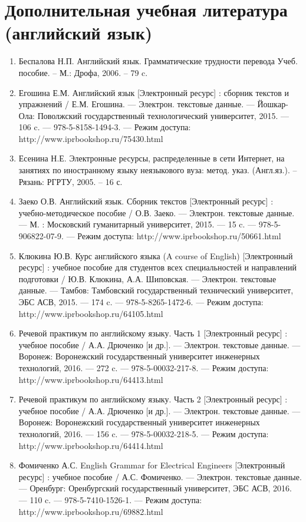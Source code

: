 \section{Дополнительная учебная литература (английский язык)}
\begin{enumerate}
\item Беспалова Н.П. Английский язык. Грамматические трудности перевода Учеб. пособие. – М.: Дрофа, 2006. – 79 c.
\item Егошина Е.М. Английский язык [Электронный ресурс] : сборник текстов и упражнений / Е.М. Егошина. — Электрон. текстовые данные. — Йошкар-Ола: Поволжский государственный технологический университет, 2015. — 106 c. — 978-5-8158-1494-3. — Режим доступа: http://www.iprbookshop.ru/75430.html
\item Есенина Н.Е. Электронные ресурсы, распределенные в сети Интернет, на занятиях по иностранному языку неязыкового вуза: метод. указ. (Англ.яз.). – Рязань: РГРТУ, 2005. – 16 с.
\item Заеко О.В. Английский язык. Сборник текстов [Электронный ресурс] : учебно-методическое пособие / О.В. Заеко. — Электрон. текстовые данные. — М. : Московский гуманитарный университет, 2015. — 15 c. — 978-5-906822-07-9. — Режим доступа: http://www.iprbookshop.ru/50661.html
\item Клюкина Ю.В. Курс английского языка (A course of English) [Электронный ресурс] : учебное пособие для студентов всех специальностей и направлений подготовки / Ю.В. Клюкина, А.А. Шиповская. — Электрон. текстовые данные. — Тамбов: Тамбовский государственный технический университет, ЭБС АСВ, 2015. — 174 c. — 978-5-8265-1472-6. — Режим доступа: http://www.iprbookshop.ru/64105.html
\item Речевой практикум по английскому языку. Часть 1 [Электронный ресурс] : учебное пособие / А.А. Дрюченко [и др.]. — Электрон. текстовые данные. — Воронеж: Воронежский государственный университет инженерных технологий, 2016. — 272 c. — 978-5-00032-217-8. — Режим доступа: http://www.iprbookshop.ru/64413.html
\item Речевой практикум по английскому языку. Часть 2 [Электронный ресурс] : учебное пособие / А.А. Дрюченко [и др.]. — Электрон. текстовые данные. — Воронеж: Воронежский государственный университет инженерных технологий, 2016. — 156 c. — 978-5-00032-218-5. — Режим доступа: http://www.iprbookshop.ru/64414.html
\item Фомиченко А.С. English Grammar for Electrical Engineers [Электронный ресурс] : учебное пособие / А.С. Фомиченко. — Электрон. текстовые данные. — Оренбург: Оренбургский государственный университет, ЭБС АСВ, 2016. — 110 c. — 978-5-7410-1526-1. — Режим доступа: http://www.iprbookshop.ru/69882.html
\end{enumerate}
